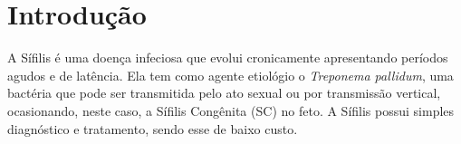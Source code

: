 \chapter{Introdução}
\label{cap:introducao}

A Sífilis é uma doença infeciosa que evolui cronicamente apresentando períodos agudos e de latência. Ela tem como agente etiológio o \textit{Treponema pallidum}, uma bactéria que pode ser transmitida pelo ato sexual ou por transmissão vertical, ocasionando, neste caso, a Sífilis Congênita (\acrshort{SC}) no feto. A Sífilis possui simples diagnóstico e tratamento, sendo esse de baixo custo. 

\cite{brasilprenatal}





